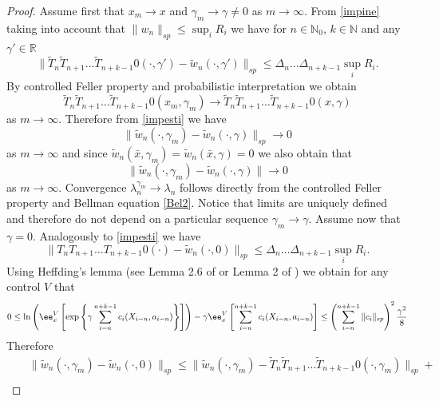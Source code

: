 \documentclass[10pt,english]{extarticle}
\begin{document}
\begin{proof}
Assume first that $x_m\to x$ and $\gamma_m\to \gamma\neq 0$ as $m\to \infty$.
From \eqref{impine} taking into account that $\|w_n\|_{sp}\leq \sup_i R_i$ we have for $n\in \mathbb{N}_0$, $k\in \mathbb{N}$ and any $\gamma' \in \mathbb{R}$
\begin{equation}\label{impesti}
\|\tilde{T}_n\tilde{T}_{n+1}\ldots \tilde{T}_{n+k-1}0(\cdot,\gamma')-\tilde{w}_n(\cdot,\gamma')\|_{sp}\leq  \Delta_n\ldots \Delta_{n+k-1}\sup_i R_i.
\end{equation}
By controlled Feller property and probabilistic interpretation we obtain
\begin{equation}
\tilde{T}_n\tilde{T}_{n+1}\ldots \tilde{T}_{n+k-1}0(x_m,\gamma_m)\to \tilde{T}_n\tilde{T}_{n+1}\ldots \tilde{T}_{n+k-1}0(x,\gamma)
\end{equation}
as $m\to \infty$. Therefore from \eqref{impesti} we have
\begin{equation}
\|\tilde{w}_n(\cdot,\gamma_m) - \tilde{w}_n(\cdot,\gamma)\|_{sp} \to 0
\end{equation}
as $m\to \infty$ and since $\tilde{w}_n(\bar{x},\gamma_m)=\tilde{w}_n(\bar{x},\gamma)=0$ we also obtain that
\begin{equation}
\|\tilde{w}_n(\cdot,\gamma_m) - \tilde{w}_n(\cdot,\gamma)\|\to 0
\end{equation}
as $m\to \infty$. Convergence $\lambda_n^{\gamma_m}\to \lambda_n$ follows directly from the controlled Feller property and Bellman equation \eqref{Bel2}. Notice that limits are uniquely defined and therefore do not depend on a particular sequence $\gamma_m\to \gamma$.
Assume now that $\gamma=0$. Analogously to \eqref{impesti} we have
 \begin{equation}\label{impesti2}
\|{T}_n{T}_{n+1}\ldots {T}_{n+k-1}0(\cdot)-\tilde{w}_n(\cdot,0)\|_{sp}\leq \Delta_n\ldots \Delta_{n+k-1}\sup_i R_i.
\end{equation}
Using Heffding's lemma (see Lemma 2.6 of \cite{Ma} or Lemma 2 of \cite{Ste2024}) we obtain for any control $V$ that
\begin{equation}\label{impesti3}
 0\leq \ln \left(\ee^V_x \left[\exp\left\{\gamma\sum_{i=n}^{n+k-1}c_i(X_{i-n},a_{i-n})\right\}\right]\right) -  \gamma \ee^V_x\left[\sum_{i=n}^{n+k-1}c_i(X_{i-n},a_{i-n})\right]\leq \left(\sum_{i=n}^{n+k-1}\|c_i\|_{sp}\right)^2 {\gamma^2 \over 8}
\end{equation}
Therefore
\begin{eqnarray}
&&\|\tilde{w}_n(\cdot,\gamma_m)-\tilde{w}_n(\cdot,0)\|_{sp}\leq\|\tilde{w}_n(\cdot,\gamma_m)-\tilde{T}_n\tilde{T}_{n+1}\ldots \tilde{T}_{n+k-1}0(\cdot,\gamma_m)\|_{sp}+ \nonumber \\

\end{eqnarray}
\end{proof}
\end{document}
